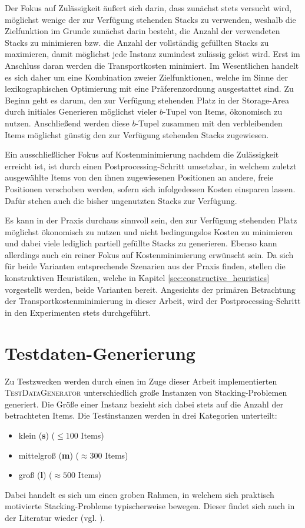Der Fokus auf Zulässigkeit äußert sich darin, dass zunächst stets versucht wird, möglichst wenige der zur Verfügung stehenden Stacks zu verwenden, weshalb die Zielfunktion im Grunde zunächst darin besteht, die Anzahl der verwendeten Stacks zu minimieren bzw. die Anzahl der vollständig gefüllten Stacks zu maximieren, damit möglichst jede Instanz zumindest zulässig gelöst wird.
Erst im Anschluss daran werden die Transportkosten minimiert.
Im Wesentlichen handelt es sich daher um eine Kombination zweier Zielfunktionen,
welche im Sinne der lexikographischen Optimierung mit eine Präferenzordnung ausgestattet sind.
Zu Beginn geht es darum, den zur Verfügung stehenden Platz in der Storage-Area durch initiales Generieren
möglichst vieler $b$-Tupel von Items, ökonomisch zu nutzen. Anschließend werden diese $b$-Tupel
zusammen mit den verbleibenden Items möglichst günstig den zur Verfügung stehenden Stacks zugewiesen.

Ein ausschließlicher Fokus auf Kostenminimierung nachdem die Zulässigkeit erreicht ist, ist durch
einen Postprocessing-Schritt umsetzbar, in welchem zuletzt ausgewählte Items von den ihnen zugewiesenen Positionen
an andere, freie Positionen verschoben werden, sofern sich infolgedessen Kosten einsparen lassen.
Dafür stehen auch die bisher ungenutzten Stacks zur Verfügung.

\pagebreak

Es kann in der Praxis durchaus sinnvoll sein, den zur Verfügung stehenden Platz möglichst ökonomisch zu nutzen
und nicht bedingungslos Kosten zu minimieren und dabei viele lediglich partiell gefüllte Stacks zu generieren.
Ebenso kann allerdings auch ein reiner Fokus auf Kostenminimierung erwünscht sein. Da sich für beide Varianten
entsprechende Szenarien aus der Praxis finden, stellen die konstruktiven Heuristiken,
welche in Kapitel \ref{sec:constructive_heuristics} vorgestellt werden, beide Varianten bereit.
Angesichts der primären Betrachtung der Transportkostenminimierung in dieser Arbeit,
wird der Postprocessing-Schritt in den Experimenten stets durchgeführt.

\section{Testdaten-Generierung}
\label{sec:test_data}

Zu Testzwecken werden durch einen im Zuge dieser Arbeit implementierten \textsc{TestDataGenerator}
unterschiedlich große Instanzen von Stacking-Problemen generiert. Die Größe einer
Instanz bezieht sich dabei stets auf die Anzahl der betrachteten Items. Die Testinstanzen werden
in drei Kategorien unterteilt:
\begin{itemize}
  \item klein (\textbf{s}) ($\leq 100$ Items)
  \item mittelgroß (\textbf{m}) ($\approx 300$ Items)
  \item groß (\textbf{l}) ($\approx 500$ Items)\newline
\end{itemize}
Dabei handelt es sich um einen groben Rahmen, in welchem sich praktisch motivierte Stacking-Probleme
typischerweise bewegen. Dieser findet sich auch in der Literatur wieder (vgl. \citet{Le2016}).

